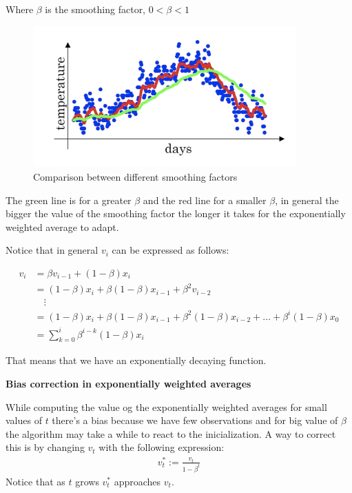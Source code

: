 Where $\beta$ is the smoothing factor, $0 < \beta < 1$ 
\begin{figure}[H]
    \begin{center}
            \includegraphics[width=0.9\textwidth]{img/es.png}
            \caption{Comparison between different smoothing factors}
        \end{center}
\end{figure}

The green line is for a greater $\beta$ and the red line for a smaller $\beta$, in general
the bigger the value of the smoothing factor the longer it takes for the exponentially 
weighted average to adapt.

Notice that in general $v_i$ can be expressed as follows:

\begin{align*}
    v_i &= \beta v_{i-1} + (1-\beta) x_i \\
        &= (1-\beta) x_i + \beta(1-\beta) x_{i-1} + \beta^2 v_{i-2} \\
        & \quad \vdots \\
        &= (1-\beta) x_i + \beta(1-\beta) x_{i-1} + \beta^2(1-\beta)x_{i-2} + \dots + \beta^i(1-\beta)x_0\\
        &= \sum_{k=0}^i \beta^{i-k} (1-\beta) x_i
\end{align*}

That means that we have an exponentially decaying function.

\textbf{Bias correction in exponentially weighted averages}

While computing the value og the exponentially weighted averages for small values of $t$
there's a bias because we have few observations and for big value of $\beta$ the 
algorithm may take a while to react to the inicialization. A way to correct this is by
changing $v_t$ with the following expression:
\begin{align*}
    v_t^* := \frac{v_t}{1-\beta^t}
\end{align*}
Notice that as $t$ grows $v_t^*$ approaches $v_t$.

